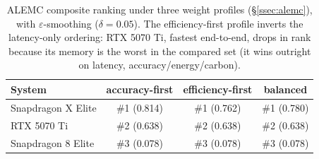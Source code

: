 \begin{table}[t]
\centering
\caption{ALEMC composite ranking under three weight profiles (\S\ref{ssec:alemc}), with $\varepsilon$-smoothing ($\delta{=}0.05$). The efficiency-first profile inverts the latency-only ordering: RTX 5070 Ti, fastest end-to-end, drops in rank because its memory is the worst in the compared set (it wins outright on latency, accuracy/energy/carbon).}
\label{tab:composite}
\small
\begin{tabular}{lccc}
\toprule
System & accuracy-\allowbreak first & efficiency-\allowbreak first & balanced \\
\midrule
Snapdragon X Elite & \#1 (0.814) & \#1 (0.762) & \#1 (0.780) \\
RTX 5070 Ti & \#2 (0.638) & \#2 (0.638) & \#2 (0.638) \\
Snapdragon 8 Elite & \#3 (0.078) & \#3 (0.078) & \#3 (0.078) \\
\bottomrule
\end{tabular}
\end{table}